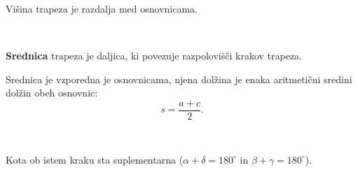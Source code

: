             Višina trapeza je razdalja med osnovnicama.

            ~

            \begin{definicija}
                \textbf{Srednica} trapeza je daljica, ki povezuje razpolovišči krakov trapeza.
            \end{definicija}

            \begin{izrek}
                Srednica je vzporedna je osnovnicama, njena dolžina je enaka aritmetični sredini dolžin obeh osnovnic:
                $$s=\frac{a+c}{2}.$$
            \end{izrek}

            
            ~

            \begin{trditev}
                Kota ob istem kraku sta suplementarna ($\alpha+\delta=180^\circ$ in $\beta+\gamma=180^\circ$).
            \end{trditev}
        
~
        
